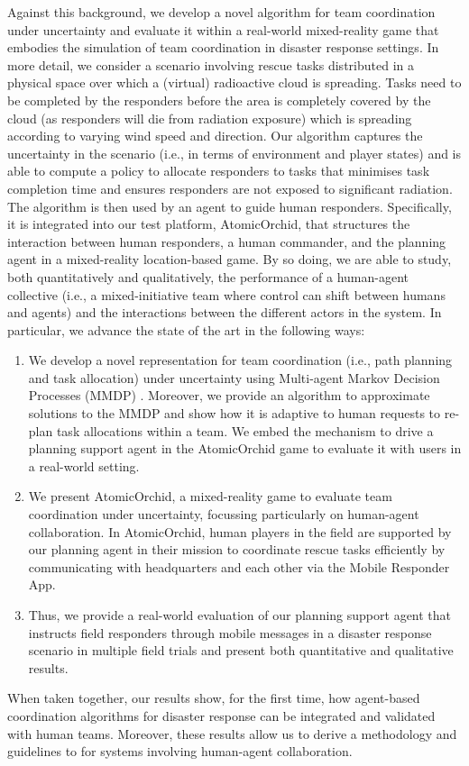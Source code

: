 Against this background, we develop a novel algorithm for team coordination under uncertainty and evaluate it within a real-world mixed-reality game that embodies the simulation of team coordination in disaster response settings. In more detail, we consider a scenario involving rescue tasks distributed in a physical space over which a (virtual) radioactive cloud is spreading. Tasks need to be completed by the responders before the area is completely covered by the cloud (as responders will die from radiation exposure) which is spreading according to varying wind speed and direction. Our algorithm captures the uncertainty in the scenario (i.e., in terms of environment and player states) and  is able to compute a policy to allocate responders to tasks that minimises task completion time and ensures responders are not exposed to significant radiation. The algorithm is then used by an agent to guide human responders. Specifically, it is integrated  into our test platform, AtomicOrchid, that structures the interaction between human responders, a human commander, and the planning agent in a mixed-reality location-based game. By so doing, we are able to study, both quantitatively and qualitatively, the performance of a human-agent collective (i.e., a mixed-initiative team where control can shift between humans and agents)  and the interactions between the different actors in the system. In particular, we  advance the state of the art in the following ways:
\begin{enumerate}
\item We develop a novel representation  for team coordination (i.e., path planning and task allocation) under uncertainty using Multi-agent Markov Decision Processes (MMDP)  \cite{boutilier1996planning}. Moreover, we provide an algorithm to approximate solutions to the MMDP and show how it is adaptive to human requests to re-plan task allocations within a team.   We embed the mechanism to drive a planning support agent in the AtomicOrchid game to evaluate it with users in a real-world setting. 
\item We present AtomicOrchid, a mixed-reality game to evaluate team coordination under uncertainty, focussing particularly on human-agent collaboration. In AtomicOrchid, human players in the field are supported by our planning agent in their mission to coordinate rescue tasks efficiently by communicating with headquarters and each other via the Mobile Responder App.
\item Thus, we provide a real-world evaluation of our planning support agent that instructs field responders through mobile messages in a disaster response scenario in multiple field trials and present both quantitative and qualitative results. 
\end{enumerate}
When taken together, our results show, for the first time, how agent-based coordination algorithms for disaster response can be integrated and validated with human teams. Moreover, these results allow us to derive a methodology and guidelines to for systems involving  human-agent collaboration. 


